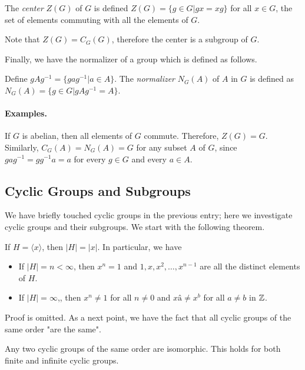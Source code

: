 \begin{definition}
The \emph{center} $Z(G)$ of $G$ is defined $Z(G) =\{g \in G | gx = xg \}$ for all $x \in G$, the set of elements commuting with all the elements of $G$. 
\end{definition}

Note that $Z(G) = C_G(G)$, therefore the center is a subgroup of $G$.

Finally, we have the normalizer of a group which is defined as follows.

\begin{definition}
Define $gAg^{-1} = \{gag^{-1} | a \in A\}$. The \emph{normalizer} $N_G(A)$ of $A$ in $G$ is defined as $N_G(A) =\{g \in G | gAg^{-1} = A\}$.
\end{definition}

\paragraph{Examples.} If $G$ is abelian, then all elements of $G$ commute. Therefore, $Z(G) = G$. Similarly, $C_G(A) = N_G(A) = G$ for any subset $A$ of $G$, since $gag^{-1} = gg^{-1}a = a$ for every $g \in G$ and every $a \in A$.


\subsection{Cyclic Groups and Subgroups}

We have briefly touched cyclic groups in the previous entry; here we investigate cyclic groups and their subgroups. We start with the following theorem.

\begin{theorem}
If $H = \langle x \rangle$, then $|H| = |x|$. In particular, we have

\begin{itemize}
\item If $|H| = n < \infty$, then $x^n = 1$ and $1, x, x^2, \ldots, x^{n-1}$ are all the distinct elements of $H$.
\item If $|H| = \infty$,, then $x^n \neq 1$ for all $n \neq 0$ and $xâ \neq x^b$ for all $a \neq b$ in $\mathbb{Z}$.
\end{itemize}

\end{theorem}

Proof is omitted. As a next point, we have the fact that all cyclic groups of the same order "are the same".

\begin{theorem}
Any two cyclic groups of the same order are isomorphic. This holds for both finite and infinite cyclic groups.	
\end{theorem}

